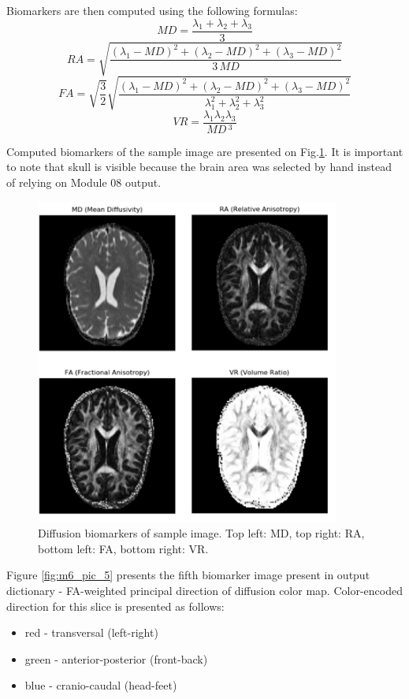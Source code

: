 Biomarkers are then computed using the following formulas:
\begin{equation}
MD = \dfrac{\lambda_{1}+\lambda_{2}+\lambda_{3}}{3}
\end{equation}
\begin{equation}
RA = \sqrt{\dfrac{\left(\lambda_{1}-MD\right)^2+\left(\lambda_{2}-MD\right)^2+\left(\lambda_{3}-MD\right)^2}{3\,MD}}
\end{equation}
\begin{equation}
FA = \sqrt{\dfrac{3}{2}}\sqrt{\dfrac{\left(\lambda_{1}-MD\right)^2+\left(\lambda_{2}-MD\right)^2+\left(\lambda_{3}-MD\right)^2}{\lambda_{1}^2+\lambda_{2}^2+\lambda_{3}^2}}
\end{equation}
\begin{equation}
VR = \frac{\lambda_{1}\lambda_{2}\lambda_{3}}{MD\,^3}
\end{equation}

Computed biomarkers of the sample image are presented on Fig.\ref{fig:m6_pic_4}. It is important to note that skull is visible because the brain area was selected by hand instead of relying on Module 08 output.

\begin{figure}[H]
	\includegraphics[width=10cm]{figures/Module_06/biomarkers_wls}
	\centering
	\caption{Diffusion biomarkers of sample image. Top left: MD, top right: RA, bottom left: FA, bottom right: VR.}
	\label{fig:m6_pic_4}
\end{figure}

Figure \ref{fig:m6_pic_5} presents the fifth biomarker image present in output dictionary - FA-weighted principal direction of diffusion color map. Color-encoded direction for this slice is presented as follows:
\begin{itemize}
	\item 
	red - transversal (left-right)	
	\item 
	green - anterior-posterior (front-back)
	\item
	blue - cranio-caudal (head-feet)
\end{itemize}

